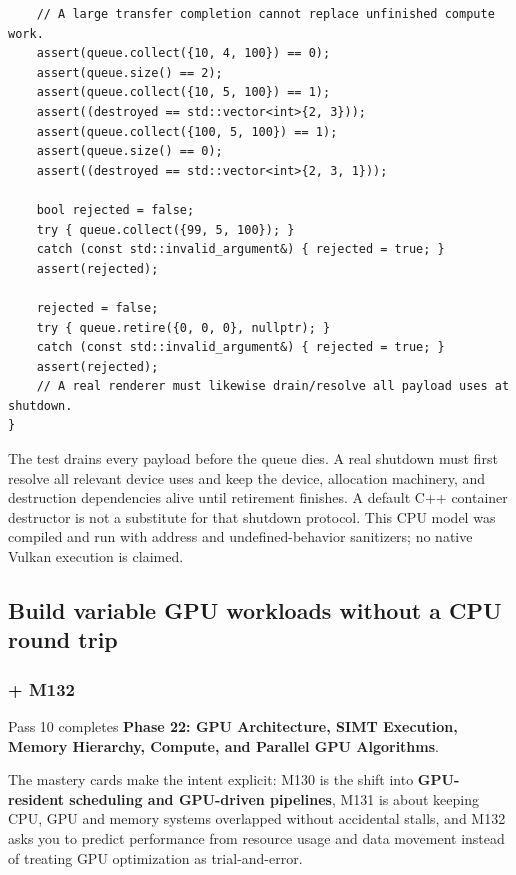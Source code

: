 \begin{verbatim}
    // A large transfer completion cannot replace unfinished compute work.
    assert(queue.collect({10, 4, 100}) == 0);
    assert(queue.size() == 2);
    assert(queue.collect({10, 5, 100}) == 1);
    assert((destroyed == std::vector<int>{2, 3}));
    assert(queue.collect({100, 5, 100}) == 1);
    assert(queue.size() == 0);
    assert((destroyed == std::vector<int>{2, 3, 1}));

    bool rejected = false;
    try { queue.collect({99, 5, 100}); }
    catch (const std::invalid_argument&) { rejected = true; }
    assert(rejected);

    rejected = false;
    try { queue.retire({0, 0, 0}, nullptr); }
    catch (const std::invalid_argument&) { rejected = true; }
    assert(rejected);
    // A real renderer must likewise drain/resolve all payload uses at shutdown.
}
\end{verbatim}

The test drains every payload before the queue dies. A real shutdown must first resolve all relevant device uses and keep the device, allocation machinery, and destruction dependencies alive until retirement finishes. A default C++ container destructor is not a substitute for that shutdown protocol. This CPU model was compiled and run with address and undefined-behavior sanitizers; no native Vulkan execution is claimed.

\subsection{Build variable GPU workloads without a CPU round trip}\label{05-engine-i-ch019-build-variable-gpu-workloads-without-a-cpu-round-trip}

\hypertarget{05-engine-i-ch019-build-variable-gpu-workloads-without-a-cpu-round-trip}{}

\subsubsection{+ M132}\label{05-engine-i-ch019-m132}

\hypertarget{05-engine-i-ch019-m132}{}

Pass 10 completes \textbf{Phase 22: GPU Architecture, SIMT Execution, Memory Hierarchy, Compute, and Parallel GPU Algorithms}.

The mastery cards make the intent explicit: M130 is the shift into \textbf{GPU-resident scheduling and GPU-driven pipelines}, M131 is about keeping CPU, GPU and memory systems overlapped without accidental stalls, and M132 asks you to predict performance from resource usage and data movement instead of treating GPU optimization as trial-and-error.

